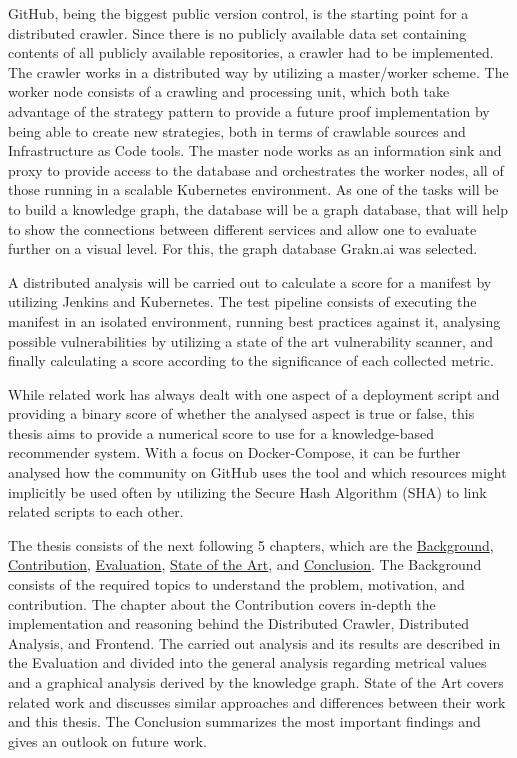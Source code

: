 GitHub, being the biggest public version control, is the starting point for a distributed crawler. Since there is no publicly available data set containing contents of all publicly available repositories, a crawler had to be implemented. The crawler works in a distributed way by utilizing a master/worker scheme. The worker node consists of a crawling and processing unit, which both take advantage of the strategy pattern to provide a future proof implementation by being able to create new strategies, both in terms of crawlable sources and Infrastructure as Code tools. The master node works as an information sink and proxy to provide access to the database and orchestrates the worker nodes, all of those running in a scalable Kubernetes environment.
As one of the tasks will be to build a knowledge graph, the database will be a graph database, that will help to show the connections between different services and allow one to evaluate further on a visual level. For this, the graph database Grakn.ai was selected.

A distributed analysis will be carried out to calculate a score for a manifest by utilizing Jenkins and Kubernetes. The test pipeline consists of executing the manifest in an isolated environment, running best practices against it, analysing possible vulnerabilities by utilizing a state of the art vulnerability scanner, and finally calculating a score according to the significance of each collected metric.

While related work has always dealt with one aspect of a deployment script and providing a binary score of whether the analysed aspect is true or false, this thesis aims to provide a numerical score to use for a knowledge-based recommender system. With a focus on Docker-Compose, it can be further analysed how the community on GitHub uses the tool and which resources might implicitly be used often by utilizing the Secure Hash Algorithm (SHA) to link related scripts to each other.

The thesis consists of the next following 5 chapters, which are the \hyperref[sec:background]{Background}, \hyperref[sec:contribution]{Contribution}, \hyperref[sec:evaluation]{Evaluation}, \hyperref[sec:stateofart]{State of the Art}, and \hyperref[sec:conclusion]{Conclusion}. The Background consists of the required topics to understand the problem, motivation, and contribution. The chapter about the Contribution covers in-depth the implementation and reasoning behind the Distributed Crawler, Distributed Analysis, and Frontend. The carried out analysis and its results are described in the Evaluation and divided into the general analysis regarding metrical values and a graphical analysis derived by the knowledge graph. State of the Art covers related work and discusses similar approaches and differences between their work and this thesis. The Conclusion summarizes the most important findings and gives an outlook on future work.